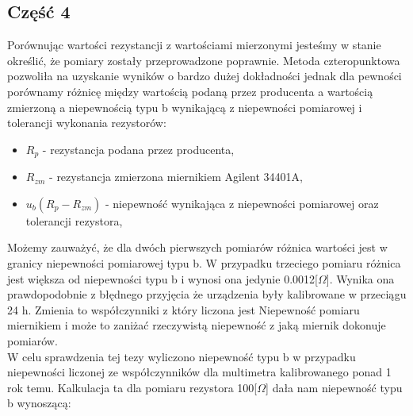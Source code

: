 \documentclass[11pt]{article}
\begin{document}
    \subsection*{Część 4}
    Porównując wartości rezystancji z wartościami mierzonymi jesteśmy w stanie określić, że pomiary zostały przeprowadzone poprawnie.
    Metoda czteropunktowa pozwoliła na uzyskanie wyników o bardzo dużej dokładności jednak dla pewności porównamy różnicę między wartością
    podaną przez producenta a wartością zmierzoną a niepewnością typu b wynikającą z niepewności pomiarowej i tolerancji wykonania rezystorów:
    \begin{center}
    \end{center}
    {\footnotesize
        \begin{itemize}
            \setlength\itemsep{0em}
            \item[] \boldmath$R_p$ - rezystancja podana przez producenta,
            \item[] \boldmath$R_{zm}$ - rezystancja zmierzona miernikiem Agilent 34401A,
            \item[] \boldmath$u_b(R_p-R_{zm})$ - niepewność wynikająca z niepewności pomiarowej oraz tolerancji rezystora,
        \end{itemize}}
    Możemy zauważyć, że dla dwóch pierwszych pomiarów różnica wartości jest w granicy niepewności pomiarowej typu b.
    W przypadku trzeciego pomiaru różnica jest większa od niepewności typu b i wynosi ona jedynie
    0.0012[$\Omega$]. Wynika ona prawdopodobnie z błędnego przyjęcia
    że urządzenia były kalibrowane w przeciągu 24 h. Zmienia to współczynniki z który liczona jest
    Niepewność pomiaru miernikiem i może to zaniżać rzeczywistą niepewność z jaką miernik dokonuje pomiarów.\\
    W celu sprawdzenia tej tezy wyliczono niepewność typu b w przypadku niepewności
    liczonej ze współczynników dla multimetra kalibrowanego ponad 1 rok temu.
    Kalkulacja ta dla pomiaru rezystora 100[$\Omega$] dała nam niepewność typu b wynoszącą:
\end{document}
